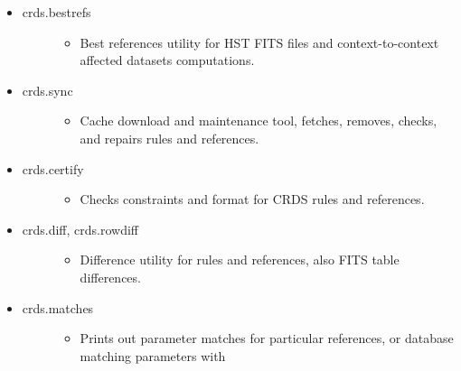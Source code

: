 \documentclass[letterpaper,10pt,english]{sphinxmanual}
\begin{document}
\begin{itemize}
\item {} \begin{description}
\item[{crds.bestrefs}] \leavevmode\begin{itemize}
\item {} 
Best references utility for HST FITS files and context-to-context affected datasets computations.

\end{itemize}

\end{description}

\item {} \begin{description}
\item[{crds.sync}] \leavevmode\begin{itemize}
\item {} 
Cache download and maintenance tool, fetches, removes, checks, and repairs rules and references.

\end{itemize}

\end{description}

\item {} \begin{description}
\item[{crds.certify}] \leavevmode\begin{itemize}
\item {} 
Checks constraints and format for CRDS rules and references.

\end{itemize}

\end{description}

\item {} \begin{description}
\item[{crds.diff, crds.rowdiff}] \leavevmode\begin{itemize}
\item {} 
Difference utility for rules and references,  also FITS table differences.

\end{itemize}

\end{description}

\item {} \begin{description}
\item[{crds.matches}] \leavevmode\begin{itemize}
\item {} 
Prints out parameter matches for particular references,  or database matching parameters with


\end{itemize}
\end{description}
\end{itemize}
\end{document}
